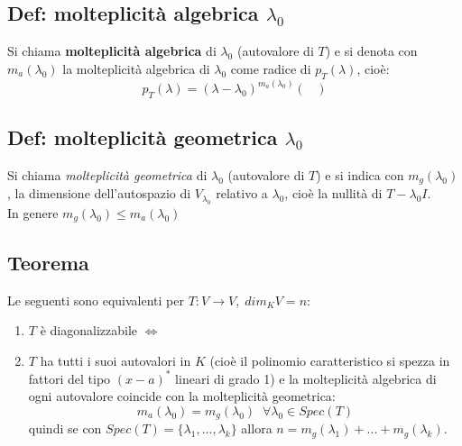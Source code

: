\subsection{Def: molteplicità algebrica $\lambda_0$}  
Si chiama \textbf{molteplicità algebrica} di $\lambda_0$ (autovalore di $T$) e si denota con $m_a(\lambda_0)$ la molteplicità algebrica di $\lambda_0$ come radice di $p_T(\lambda)$, cioè:
  \[p_T(\lambda)=(\lambda -\lambda_0)^{m_a(\lambda_0)}(\;\;\;)\]

\subsection{Def: molteplicità geometrica $\lambda_0$}
Si chiama \textit{molteplicità geometrica} di $\lambda_0$ (autovalore di $T$) e si indica con $m_g(\lambda_0)$, la dimensione dell'autospazio di $V_{\lambda_0}$ relativo a $\lambda_0$, cioè la nullità di $T-\lambda_0 I$.
  \\In genere $m_g(\lambda_0)\leq m_a(\lambda_0)$

\subsection{Teorema}
Le seguenti sono equivalenti per $T:V\rightarrow V, \; dim_KV=n$:
\begin{enumerate}
\item $T$ è diagonalizzabile $\Leftrightarrow $

\item $T$ ha tutti i suoi autovalori in $K$ (cioè il polinomio caratteristico si spezza in fattori del tipo $(x-a)^*$ lineari di grado 1) e la molteplicità algebrica di ogni autovalore coincide con la molteplicità geometrica:
  \[m_a(\lambda_0)=m_g(\lambda_0)\;\;\forall\lambda_0\in Spec(T)\]
  quindi se con $Spec(T)=\{\lambda_1,...,\lambda_k\}$ allora $n=m_g(\lambda_1)+...+m_g(\lambda_k)$.

\end{enumerate}
